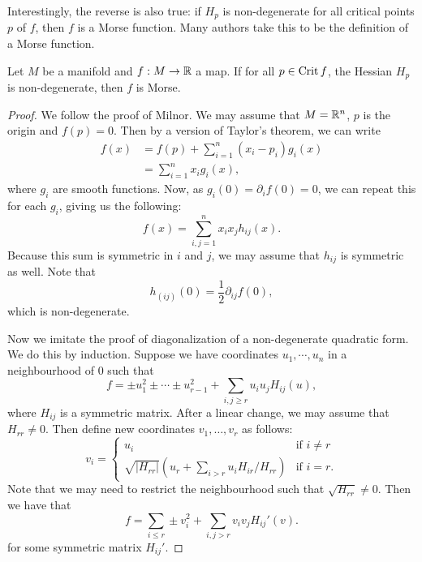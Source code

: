 Interestingly, the reverse is also true: if $H_p$ is non-degenerate for all critical points  $p$ of $f$, then  $f$ is a Morse function.
Many authors take this to be the definition of a Morse function.

\begin{lemma}
    Let $M$ be a manifold and $f: M \to  \mathbb{R}$ a map.
    If for all $p \in \operatorname{Crit} f$, the Hessian $H_p$ is non-degenerate, then $f$ is Morse.
\end{lemma}
\begin{proof}
    We follow the proof of Milnor.
    We may assume that $M = \mathbb{R}^{n}$, $p$ is the origin and $f(p) = 0$.
    Then by a version of Taylor's theorem, we can write
    \begin{align*}
        f(x)  &= f(p) + \sum_{i=1}^{n} (x_i - p_i) g_i (x)\\
              &= \sum_{i=1}^{n} x_i g_i(x)
    ,\end{align*} 
    where $g_i$ are smooth functions. 
    Now, as $g_i(0) = \partial_i f (0) = 0$, we can repeat this for each  $g_i$, giving us the following:
    \[
        f(x) = \sum_{i, j= 1}^{n} x_i x_j h_{ij}(x)
    .\] 
    Because this sum is symmetric in $i$ and  $j$, we may assume that  $h_{ij}$ is symmetric as well.
    Note that
    \[
        h_{(ij)}(0) = \frac{1}{2} \partial_{ij} f(0)
    ,\]
    which is non-degenerate.

    Now we imitate the proof of diagonalization of a non-degenerate quadratic form.
    We do this by induction.
    Suppose we have coordinates $u_1, \cdots, u_n$ in a neighbourhood of $0$ such that
    \[
        f = \pm u_1^2 \pm \cdots \pm u_{r-1}^2 + \sum_{i,j\ge r} u_i u_j H_{ij}(u)
    ,\] 
    where $H_{ij}$ is a symmetric matrix.
    After a linear change, we may assume that $H_{rr} \neq 0$.
    Then define new coordinates $ v_1, \ldots, v_r$ as follows:
    \[
        v_i = \begin{cases}
            u_i & \text{if $i \neq r$}\\
            \sqrt{|H_{rr}|} (u_r + \sum_{i > r} u_i H_{ir} / H_{rr}) & \text{if $i = r$.}
        \end{cases}
    \] 
    Note that we may need to restrict the neighbourhood such that $\sqrt{H_{rr}} \neq 0$.
    Then we have that
    \[
        f = \sum_{i\le r} \pm v_i^2 + \sum_{i,j > r} v_i v_j H_{ij}'(v)
    .\] 
    for some symmetric matrix $H_{ij}'$.

\end{proof}


